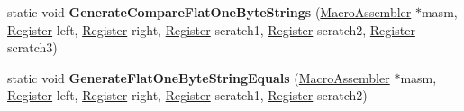 \begin{DoxyCompactItemize}
\item 
static void {\bfseries Generate\+Compare\+Flat\+One\+Byte\+Strings} (\hyperlink{classv8_1_1internal_1_1_macro_assembler}{Macro\+Assembler} $\ast$masm, \hyperlink{structv8_1_1internal_1_1_register}{Register} left, \hyperlink{structv8_1_1internal_1_1_register}{Register} right, \hyperlink{structv8_1_1internal_1_1_register}{Register} scratch1, \hyperlink{structv8_1_1internal_1_1_register}{Register} scratch2, \hyperlink{structv8_1_1internal_1_1_register}{Register} scratch3)\hypertarget{classv8_1_1internal_1_1_string_helper_a7ac6a0492ad8bfd6d538d6d38be9881f}{}\label{classv8_1_1internal_1_1_string_helper_a7ac6a0492ad8bfd6d538d6d38be9881f}

\item 
static void {\bfseries Generate\+Flat\+One\+Byte\+String\+Equals} (\hyperlink{classv8_1_1internal_1_1_macro_assembler}{Macro\+Assembler} $\ast$masm, \hyperlink{structv8_1_1internal_1_1_register}{Register} left, \hyperlink{structv8_1_1internal_1_1_register}{Register} right, \hyperlink{structv8_1_1internal_1_1_register}{Register} scratch1, \hyperlink{structv8_1_1internal_1_1_register}{Register} scratch2)\hypertarget{classv8_1_1internal_1_1_string_helper_a9078f89cbc64990f11c34a5221365dc2}{}\label{classv8_1_1internal_1_1_string_helper_a9078f89cbc64990f11c34a5221365dc2}

\end{DoxyCompactItemize}

